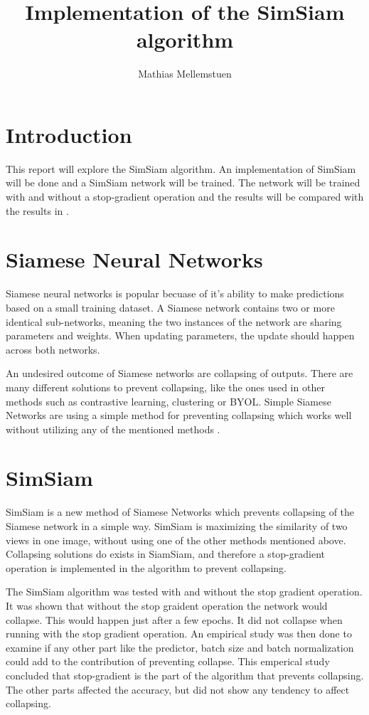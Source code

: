 \documentclass[12pt]{article}
\title{Implementation of the SimSiam algorithm}
\author{Mathias Mellemstuen}
\begin{document}
 

\maketitle

\section*{Introduction}
This report will explore the SimSiam \cite{chen2021exploring} algorithm. An implementation of SimSiam will be done and a SimSiam
network will be trained. The network will be trained with and without a stop-gradient operation and the results will be compared
with the results in \cite{chen2021exploring}.

\section*{Siamese Neural Networks}
Siamese neural networks is popular becuase of it's ability to make predictions based on a small training dataset. A Siamese
network contains two or more identical sub-networks, meaning the two instances of the network are sharing parameters and weights. When updating parameters,
the update should happen across both networks.

An undesired outcome of Siamese networks are collapsing of outputs. There are many different solutions to prevent collapsing,
like the ones used in other methods such as contrastive learning, clustering or BYOL. Simple Siamese Networks are using a simple method for
preventing collapsing which works well without utilizing any of the mentioned methods \cite{chen2021exploring}.

\section*{SimSiam}
SimSiam \cite{chen2021exploring} is a new method of Siamese Networks which prevents collapsing of the Siamese network in a simple way.
SimSiam is maximizing the similarity of two views in one image, without using one of the other
methods mentioned above. Collapsing solutions do exists in SiamSiam, and therefore a stop-gradient operation is
implemented in the algorithm to prevent collapsing.

The SimSiam algorithm was tested with and without the stop gradient operation. It was shown that
without the stop graident operation the network would collapse. This would happen just after a few epochs. It did not collapse
when running with the stop gradient operation. An empirical study was then done to examine if any other part like the predictor,
batch size and batch normalization could add to the contribution of preventing collapse. This emperical study concluded that
stop-gradient is the part of the algorithm that prevents collapsing. The other parts affected the accuracy, but did not show any
tendency to affect collapsing.
\end{document}
